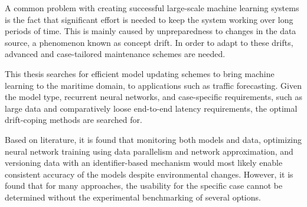 A common problem with creating successful large-scale machine learning systems is the fact that significant effort is needed to keep the system working over long periods of time. This is mainly caused by unpreparedness to changes in the data source, a phenomenon known as concept drift. In order to adapt to these drifts, advanced and case-tailored maintenance schemes are needed.

This thesis searches for efficient model updating schemes to bring machine learning to the maritime domain, to applications such as traffic forecasting. Given the model type, recurrent neural networks, and case-specific requirements, such as large data and comparatively loose end-to-end latency requirements, the optimal drift-coping methods are searched for.

Based on literature, it is found that monitoring both models and data, optimizing neural network training using data parallelism and network approximation, and versioning data with an identifier-based mechanism would most likely enable consistent accuracy of the models despite environmental changes. However, it is found that for many approaches, the usability for the specific case cannot be determined without the experimental benchmarking of several options.
  
